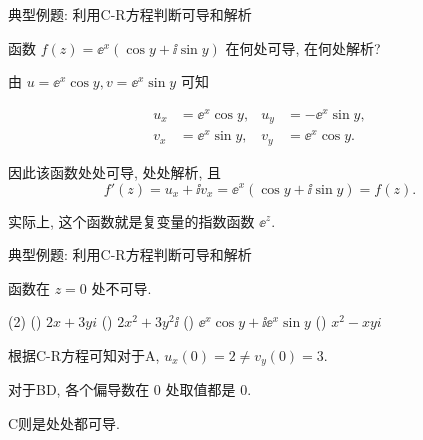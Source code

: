 \begin{frame}{典型例题: 利用C-R方程判断可导和解析}
	\onslide<+->
	\begin{example}[near]
		函数 $f(z)=\ee^x(\cos y+\ii\sin y)$ 在何处可导, 在何处解析?
	\end{example}
	\onslide<+->
	\begin{solution}[near]
		\begin{itemize*}
			\item 由 $u=\ee^x\cos y,v=\ee^x\sin y$ 可知
			\item 
			\begin{align*}
				u_x&=\ee^x\cos y,&u_y&=-\ee^x\sin y,\\
				v_x&=\ee^x\sin y,&v_y&=\ee^x\cos y.
			\end{align*}
			\item 因此该函数处处可导, 处处解析, 且
			\[
				f'(z)=u_x+\ii v_x=\ee^x(\cos y+\ii\sin y)=f(z).
			\]
			\item 实际上, 这个函数就是复变量的指数函数 $\ee^z$.
			\meddel
		\end{itemize*}
	\end{solution}
\end{frame}


\begin{frame}{典型例题: 利用C-R方程判断可导和解析}
	\onslide<+->
	\begin{exercise}[nearnext]
		函数在 $z=0$ 处不可导.
		\begin{exchoice}(2)
			() $2x+3yi$
			() $2x^2+3y^2\ii$
			() $\ee^x\cos y+\ii \ee^x\sin y$
			() $x^2-xyi$
		\end{exchoice}
	\end{exercise}
	\onslide<+->
	\begin{answer}[nearprev]
		\begin{itemize*}
			\item 根据C-R方程可知对于A, $u_x(0)=2\neq v_y(0)=3$.
			\item 对于BD, 各个偏导数在 $0$ 处取值都是 $0$.
			\item C则是处处都可导.
		\end{itemize*}
	\end{answer}
\end{frame}


